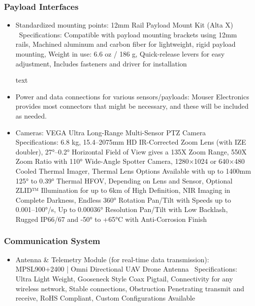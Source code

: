 \subsubsection{Payload Interfaces}
\begin{itemize}
\item Standardized mounting points:
12mm Rail Payload Mount Kit (Alta X) \
Specifications: Compatible with payload mounting brackets using 12mm rails, Machined aluminum and carbon fiber for lightweight, rigid payload mounting, Weight in use: 6.6 oz / 186 g, Quick-release levers for easy adjustment, Includes fasteners and driver for installation

text
\item Power and data connections for various sensors/payloads:
Mouser Electronics provides most connectors that might be necessary, and these will be included as needed.

\item Cameras:
VEGA Ultra Long-Range Multi-Sensor PTZ Camera \\
Specifications: 6.8 kg, 15.4–2075mm HD IR-Corrected Zoom Lens (with IZE doubler), 27°–0.2° Horizontal Field of View gives a 135X Zoom Range, 550X Zoom Ratio with 110° Wide-Angle Spotter Camera, 1280×1024 or 640×480 Cooled Thermal Imager, Thermal Lens Options Available with up to 1400mm 125° to 0.39° Thermal HFOV, Depending on Lens and Sensor, Optional ZLID™ Illumination for up to 6km of High Definition, NIR Imaging in Complete Darkness, Endless 360° Rotation Pan/Tilt with Speeds up to 0.001–100°/s, Up to 0.00036° Resolution Pan/Tilt with Low Backlash, Rugged IP66/67 and -50° to +65°C with Anti-Corrosion Finish
\end{itemize}

\subsubsection{Communication System}
\begin{itemize}
\item Antenna \& Telemetry Module (for real-time data transmission):
MPSL900+2400 | Omni Directional UAV Drone Antenna \
Specifications: Ultra Light Weight, Gooseneck Style Coax Pigtail, Connectivity for any wireless network, Stable connections, Obstruction Penetrating transmit and receive, RoHS Compliant, Custom Configurations Available
\end{itemize}